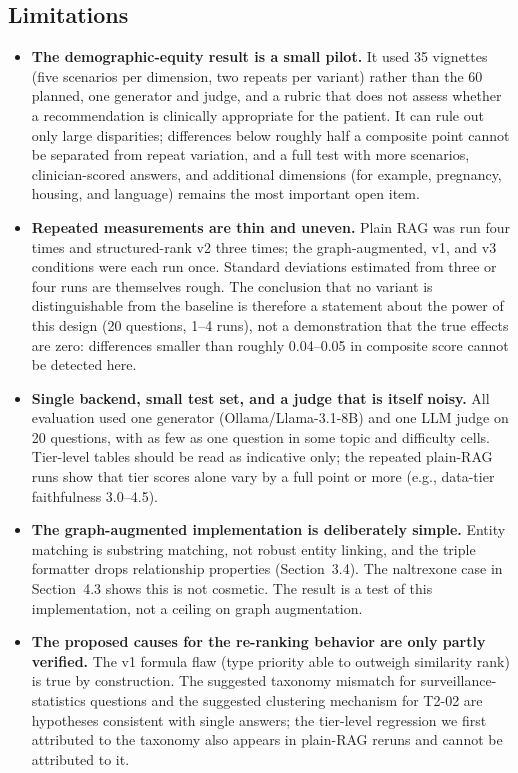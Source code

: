 \documentclass[11pt]{article}
\begin{document}
\subsection{Limitations}
\begin{itemize}[leftmargin=*]
  \item \textbf{The demographic-equity result is a small pilot.} It used 35 vignettes (five scenarios per dimension, two repeats per variant) rather than the 60 planned, one generator and judge, and a rubric that does not assess whether a recommendation is clinically appropriate for the patient. It can rule out only large disparities; differences below roughly half a composite point cannot be separated from repeat variation, and a full test with more scenarios, clinician-scored answers, and additional dimensions (for example, pregnancy, housing, and language) remains the most important open item.
  \item \textbf{Repeated measurements are thin and uneven.} Plain RAG was run four times and structured-rank v2 three times; the graph-augmented, v1, and v3 conditions were each run once. Standard deviations estimated from three or four runs are themselves rough. The conclusion that no variant is distinguishable from the baseline is therefore a statement about the power of this design (20 questions, 1--4 runs), not a demonstration that the true effects are zero: differences smaller than roughly 0.04--0.05 in composite score cannot be detected here.
  \item \textbf{Single backend, small test set, and a judge that is itself noisy.} All evaluation used one generator (Ollama/Llama-3.1-8B) and one LLM judge on 20 questions, with as few as one question in some topic and difficulty cells. Tier-level tables should be read as indicative only; the repeated plain-RAG runs show that tier scores alone vary by a full point or more (e.g., data-tier faithfulness 3.0--4.5).
  \item \textbf{The graph-augmented implementation is deliberately simple.} Entity matching is substring matching, not robust entity linking, and the triple formatter drops relationship properties (Section~3.4). The naltrexone case in Section~4.3 shows this is not cosmetic. The result is a test of this implementation, not a ceiling on graph augmentation.
  \item \textbf{The proposed causes for the re-ranking behavior are only partly verified.} The v1 formula flaw (type priority able to outweigh similarity rank) is true by construction. The suggested taxonomy mismatch for surveillance-statistics questions and the suggested clustering mechanism for T2-02 are hypotheses consistent with single answers; the tier-level regression we first attributed to the taxonomy also appears in plain-RAG reruns and cannot be attributed to it.

\end{itemize}
\end{document}
